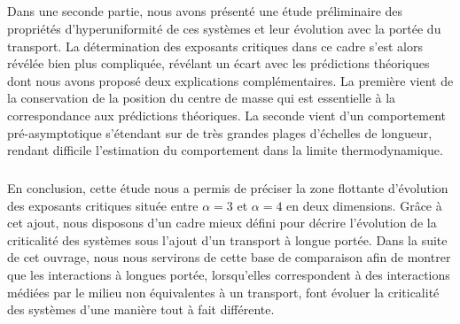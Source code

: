 \subparagraph{}Dans une seconde partie, nous avons présenté une étude préliminaire des propriétés d'hyperuniformité de ces systèmes et leur évolution avec la portée du transport. La détermination des exposants critiques dans ce cadre s'est alors révélée bien plus compliquée, révélant un écart avec les prédictions théoriques dont nous avons proposé deux explications complémentaires. La première vient de la conservation de la position du centre de masse qui est essentielle à la correspondance aux prédictions théoriques. La seconde vient d'un comportement pré-asymptotique s'étendant sur de très grandes plages d'échelles de longueur, rendant difficile l'estimation du comportement dans la limite thermodynamique.

\subparagraph{}En conclusion, cette étude nous a permis de préciser la zone flottante d'évolution des exposants critiques située entre $\alpha=3$ et $\alpha = 4$ en deux dimensions. Grâce à cet ajout, nous disposons d'un cadre mieux défini pour décrire l'évolution de la criticalité des systèmes sous l'ajout d'un transport à longue portée. Dans la suite de cet ouvrage, nous nous servirons de cette base de comparaison afin de montrer que les interactions à longues portée, lorsqu'elles correspondent à des interactions médiées par le milieu non équivalentes à un transport, font évoluer la criticalité des systèmes d'une manière tout à fait différente.
